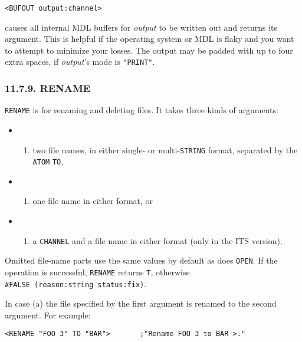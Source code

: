 \documentclass[a4paper,]{article}
\providecommand{\tightlist}{%
  \setlength{\itemsep}{0pt}\setlength{\parskip}{0pt}}
\begin{document}
\begin{verbatim}
<BUFOUT output:channel>
\end{verbatim}

 causes all internal MDL buffers for \emph{output} to be written out and returns its
argument. This is helpful if the operating system or MDL is flaky and you want to attempt to minimize your losses. The
output may be padded with up to four extra spaces, if \emph{output}'s mode is \texttt{"PRINT"}.

\subsubsection{11.7.9. RENAME}\label{rename}

 \texttt{RENAME} is for renaming and deleting files. It takes three kinds of arguments:

\begin{itemize}
\item
  \begin{enumerate}
  \def\labelenumi{(\alph{enumi})}
  \tightlist
  \item
    two file names, in either single- or multi-\texttt{STRING} format, separated by the \texttt{ATOM}
    \texttt{TO},
  \end{enumerate}
\item
  \begin{enumerate}
  \def\labelenumi{(\alph{enumi})}
  \setcounter{enumi}{1}
  \tightlist
  \item
    one file name in either format, or
  \end{enumerate}
\item
  \begin{enumerate}
  \def\labelenumi{(\alph{enumi})}
  \setcounter{enumi}{2}
  \tightlist
  \item
    a \texttt{CHANNEL} and a file name in either format (only in the ITS version).
  \end{enumerate}
\end{itemize}

Omitted file-name parts use the same values by default as does \texttt{OPEN}. If the operation is successful,
\texttt{RENAME} returns \texttt{T}, otherwise \texttt{\#FALSE\ (reason:string\ status:fix)}.

In case (a) the file specified by the first argument is renamed to the second argument. For example:

\begin{verbatim}
<RENAME "FOO 3" TO "BAR">       ;"Rename FOO 3 to BAR >."
\end{verbatim}
\end{document}
